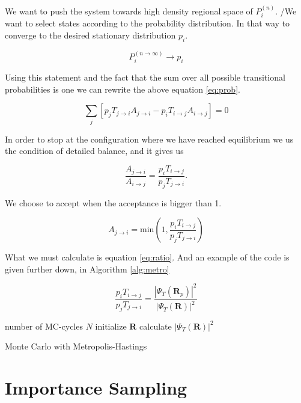 We want to push the system towards high density regional space of $P_i^{(n)}$. /We want to select states according to the probability distribution. In that way to converge to the desired stationary distribution $p_i$.

$$P_i^{(n \rightarrow \infty)} \rightarrow p_i$$

Using this statement and the fact that the sum over all possible transitional probabilities is one we can rewrite the above equation \ref{eq:prob}.

$$\sum_j [p_j T_{j \rightarrow i}A_{j \rightarrow i} - p_i T_{i \rightarrow j}A_{i \rightarrow j}] = 0$$

In order to stop at the configuration where we have reached equilibrium we us the condition of detailed balance, and it gives us 


$$\frac{A_{j \rightarrow i}}{A_{i \rightarrow j}} = \frac{p_i T_{i \rightarrow j}}{p_j T_{j \rightarrow i}}.$$

We choose to accept when the acceptance is bigger than 1. 

$$A_{j \rightarrow i} = \mathrm{min} \left( 1, \frac{p_i T_{i \rightarrow j}}{p_j T_{j \rightarrow i}}\right)$$

What we must calculate is equation \ref{eq:ratio}. And an example of the code is given further down, in Algorithm \ref{alg:metro}

\begin{equation}\label{eq:ratio}
\frac{p_i T_{i \rightarrow j}}{p_j T_{j \rightarrow i}} = \frac{|\Psi_T(\mathbf{R}_p)|^2}{|\Psi_T(\mathbf{R})|^2}
\end{equation}

\begin{algorithm}
number of MC-cycles $N$\;
initialize $\mathbf{R}$\;
calculate $|\Psi_T(\mathbf{R})|^2$\;
 \caption{Monte Carlo with Metropolis-Hastings}\label{alg:metro}
\end{algorithm}

\section{Importance Sampling}

